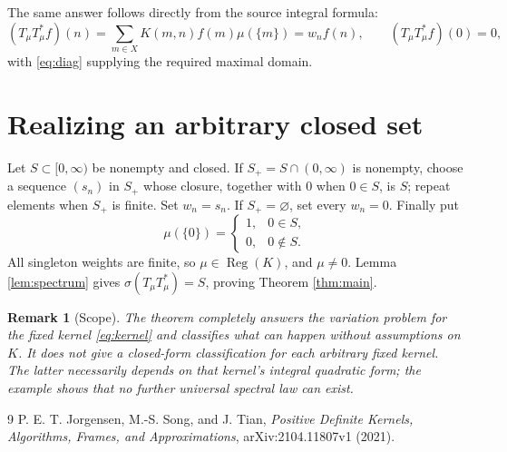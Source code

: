\documentclass[11pt]{article}
\newtheorem{remark}[theorem]{Remark}
\newcommand{\Reg}{\operatorname{Reg}}
\begin{document}
The same answer follows directly from the source integral formula:
\[
 (T_\mu T_\mu^*f)(n)
 =\sum_{m\in X}K(m,n)f(m)\mu(\{m\})=w_nf(n),
 \qquad (T_\mu T_\mu^*f)(0)=0,
\]
with \eqref{eq:diag} supplying the required maximal domain.

\section{Realizing an arbitrary closed set}

Let $S\subset[0,\infty)$ be nonempty and closed.  If
$S_+=S\cap(0,\infty)$ is nonempty, choose a sequence $(s_n)$ in $S_+$
whose closure, together with $0$ when $0\in S$, is $S$; repeat elements when
$S_+$ is finite.  Set $w_n=s_n$.  If $S_+=\varnothing$, set every $w_n=0$.
Finally put
\[
 \mu(\{0\})=\begin{cases}1,&0\in S,\\0,&0\notin S.\end{cases}
\]
All singleton weights are finite, so $\mu\in\Reg(K)$, and $\mu\ne0$.
Lemma \ref{lem:spectrum} gives $\sigma(T_\mu T_\mu^*)=S$, proving
Theorem \ref{thm:main}.

\begin{remark}[Scope]
The theorem completely answers the variation problem for the fixed kernel
\eqref{eq:kernel} and classifies what can happen without assumptions on $K$.
It does not give a closed-form classification for each arbitrary fixed
kernel.  The latter necessarily depends on that kernel's integral quadratic
form; the example shows that no further universal spectral law can exist.
\end{remark}

\begin{thebibliography}{9}
P. E. T. Jorgensen, M.-S. Song, and J. Tian,
\emph{Positive Definite Kernels, Algorithms, Frames, and Approximations},
arXiv:2104.11807v1 (2021).
\end{thebibliography}
\end{document}
